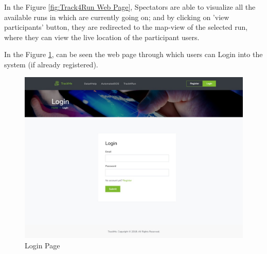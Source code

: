 \documentclass[a4paper, hidelinks, 12pt]{report}
\begin{document}
	In the Figure \ref{fig:Track4Run Web Page}, Spectators are able to visualize all the available runs in which are currently going on; and by clicking on 'view participants' button, they are redirected to the map-view of the selected run, where they can view the live location of the participant users.	
	
	In the Figure \ref{fig:Login}, can be seen the web page through which users can Login into the system (if already registered).
	
	\begin{figure}[H]
		\centering
		\includegraphics[scale=0.35]{UI/UI/9.jpeg}
		\caption[UI: Login Page]{Login Page}
		\label{fig:Login}
	\end{figure}
	
\end{document}
